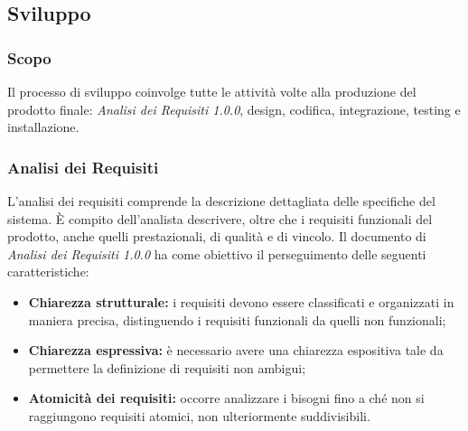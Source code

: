 \subsection{Sviluppo}
\subsubsection{Scopo}
Il processo di sviluppo coinvolge tutte le attività volte alla produzione del prodotto finale: \textit{Analisi dei Requisiti 1.0.0\docs},  design, codifica, integrazione, testing e installazione.
\subsubsection{Analisi dei Requisiti}
L'analisi dei requisiti comprende la descrizione dettagliata delle specifiche del sistema. È compito dell'analista descrivere, oltre che i requisiti funzionali del prodotto, anche quelli prestazionali, di qualità e di vincolo. 
Il documento di \textit{Analisi dei Requisiti 1.0.0\doc} ha come obiettivo il perseguimento delle seguenti caratteristiche:
\begin{itemize}
	\item \textbf{Chiarezza strutturale:} i requisiti devono essere classificati e organizzati in maniera precisa, distinguendo i requisiti funzionali da quelli non funzionali;
	\item \textbf{Chiarezza espressiva:} è necessario avere una chiarezza espositiva tale da permettere la definizione di requisiti non ambigui;
	\item \textbf{Atomicità dei requisiti:} occorre analizzare i bisogni fino a ché non si raggiungono requisiti atomici, non ulteriormente suddivisibili.  
\end{itemize}

